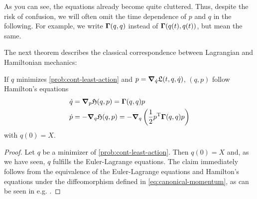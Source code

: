 As you can see, the equations already become quite cluttered.
Thus, despite the risk of confusion, we will often omit the time dependence of $p$ and $q$ in the following.
For example, we write $\mathbf{\Gamma}(q, q)$ instead of $\mathbf{\Gamma}(q(t), q(t))$, but mean the same.

The next theorem describes the classical correspondence between Lagrangian and Hamiltonian mechanics:
\begin{theorem}
	\label{theo:hamiltonian-dynamic}
	If $q$ minimizes \cref{prob:cont-least-action} and $p = \grad_{\dot{q}} \mathfrak{L}(t, q, \dot{q})$, $(q, p)$ follow Hamilton's equations
	\begin{equation}
	\label{eq:hamiltonian-system}
		\begin{split}
			\dot{q} &= \grad_p \mathfrak{H}(q, p) = \mathbf{\Gamma}(q, q) p\\
			\dot{p} &= -\grad_q \mathfrak{H}(q, p)
			= -\grad_q \left(\frac{1}{2} p^\mathrm{T} \mathbf{\Gamma}(q, q) p\right)
		\end{split}
	\end{equation}
	with $q(0) = X$.
\end{theorem}
\begin{proof}
	Let $q$ be a minimizer of \cref{prob:cont-least-action}.
	Then $q(0) = X$ and, as we have seen, $q$ fulfills the Euler-Lagrange equations.
	The claim immediately follows from the equivalence of the Euler-Lagrange equations and Hamilton's equations under the diffeomorphism defined in \cref{eq:canonical-momentum}, as can be seen in e.g. \cite{marsden10, goldstein01}.
\end{proof}

